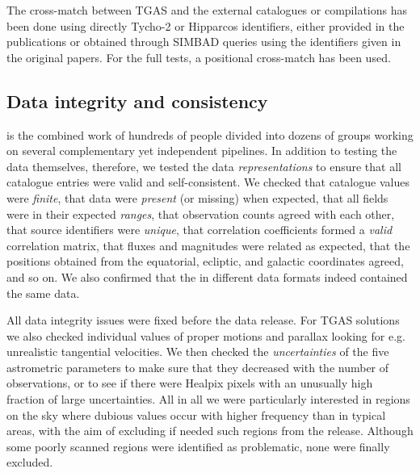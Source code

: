 The cross-match between TGAS and the external catalogues or compilations has been done using directly Tycho-2 or Hipparcos identifiers, either provided in the publications or obtained through SIMBAD queries \citep{2000A&AS..143....9W} using the identifiers given in the original papers. For the full {} tests, a positional cross-match has been used. 


\subsection{Data integrity and consistency}\label{sec:wp942:consistent}

{} is the combined work of hundreds of people divided into dozens of groups working on several complementary yet independent pipelines. 
In addition to testing the data themselves, therefore, we tested the data \emph{representations} to ensure that all catalogue entries were valid and self-consistent. We checked that catalogue values were \emph{finite}, that data were \emph{present} (or missing) when expected, that all fields were in their expected \emph{ranges}, that observation counts agreed with each other, that source identifiers were \emph{unique}, that correlation coefficients formed a \emph{valid} correlation matrix, that fluxes and magnitudes were related as expected, that the positions obtained from the equatorial, ecliptic, and galactic coordinates agreed, and so on. We also confirmed that the {} in different data formats indeed contained the same data.

All data integrity issues were fixed before the data release. 
%
%
For TGAS solutions we also checked individual values of proper motions and parallax
looking for e.g.\  unrealistic tangential velocities. We then 
checked the \emph{uncertainties} of the five astrometric parameters to make sure that
they decreased with the number of observations, or to see if there were Healpix pixels with an
unusually high fraction of large uncertainties. All in all we were particularly
interested in regions on the sky where dubious values occur with higher
frequency than in typical areas, with the aim of excluding if needed such regions from
the release. Although some poorly scanned regions were identified as
problematic, none were finally excluded.

